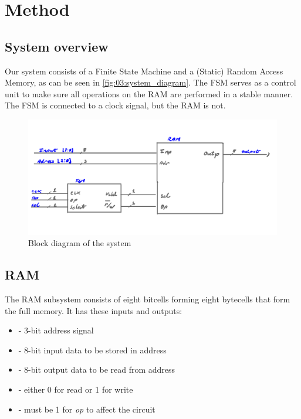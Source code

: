\section{Method}    \label{sec:03:method}
\subsection{System overview}


Our system consists of a Finite State Machine and a (Static) Random Access Memory, as can be seen in \autoref{fig:03:system_diagram}. The FSM serves as a control unit to make sure all operations on the RAM are performed in a stable manner. The FSM is connected to a clock signal, but the RAM is not.

\begin{figure}[H]
    \centering
    \includegraphics[width=0.8\linewidth]{LaTeX_2/Figures/memory_block_schematic.png}
    \caption{Block diagram of the system}
    \label{fig:03:system_diagram}
\end{figure}

\subsection{RAM}
The RAM subsystem consists of eight bitcells forming eight bytecells that form the full memory. It has these inputs and outputs:
\begin{itemize}
    \item {} - 3-bit address signal
    \item {} - 8-bit input data to be stored in address
    \item {} - 8-bit output data to be read from address
    \item {} - either 0 for read or 1 for write
    \item {} - must be 1 for \textit{op} to affect the circuit
\end{itemize}

